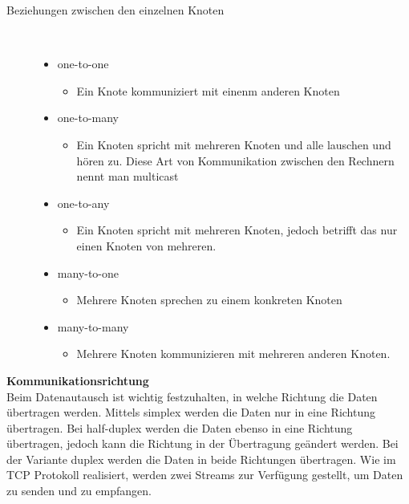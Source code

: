 \documentclass[a4paper,12pt]{article}
\begin{document}
\begin{description}
    \item[Beziehungen zwischen den einzelnen Knoten] ~\par
    \begin{itemize}
        \item one-to-one
        \begin{itemize}
            \item{Ein Knote kommuniziert mit einenm anderen Knoten}
        \end{itemize}
        \item one-to-many
        \begin{itemize}
            \item{Ein Knoten spricht mit mehreren Knoten und alle lauschen und hören zu. Diese Art von Kommunikation zwischen den Rechnern nennt man multicast}
        \end{itemize}
        \item one-to-any
        \begin{itemize}
            \item{Ein Knoten spricht mit mehreren Knoten, jedoch betrifft das nur einen Knoten von mehreren.}
        \end{itemize}
        \item many-to-one
        \begin{itemize}
            \item{Mehrere Knoten sprechen zu einem konkreten Knoten}
        \end{itemize}
        \item many-to-many
        \begin{itemize}
            \item{Mehrere Knoten kommunizieren mit mehreren anderen Knoten.\\}
        \end{itemize}
    \end{itemize} 
\end{description}
\textbf{Kommunikationsrichtung\\}
Beim Datenautausch ist wichtig festzuhalten, in welche Richtung die Daten übertragen werden. Mittels simplex werden die Daten nur in eine Richtung übertragen. 
Bei half-duplex werden die Daten ebenso in eine Richtung übertragen, jedoch kann die Richtung in der Übertragung geändert werden. Bei der Variante duplex werden die Daten in beide Richtungen übertragen. Wie im TCP Protokoll realisiert, werden zwei Streams
zur Verfügung gestellt, um Daten zu senden und zu empfangen.
\end{document}
